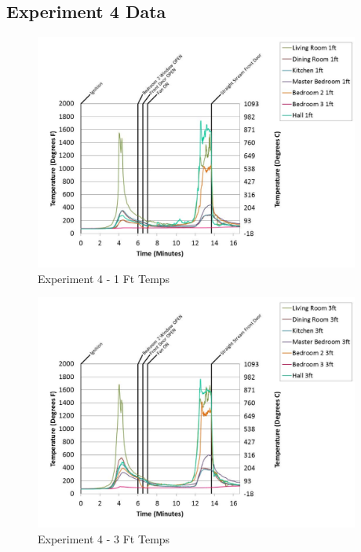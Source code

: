 \documentclass{article}
\begin{document}
\begin{appendices}
		\clearpage
\clearpage		\large
\subsection{Experiment 4 Data} \label{App:Exp4Results} 

	\begin{figure}[h!]
		\centering
		\includegraphics[height=3.05in]{0_Images/Results_Charts/Exp_4_Charts/1FtTemps.pdf}
		\caption{Experiment 4 - 1 Ft Temps}
	\end{figure}
 

	\begin{figure}[h!]
		\centering
		\includegraphics[height=3.05in]{0_Images/Results_Charts/Exp_4_Charts/3FtTemps.pdf}
		\caption{Experiment 4 - 3 Ft Temps}
	\end{figure}
 
	\clearpage


\end{appendices}
\end{document}
